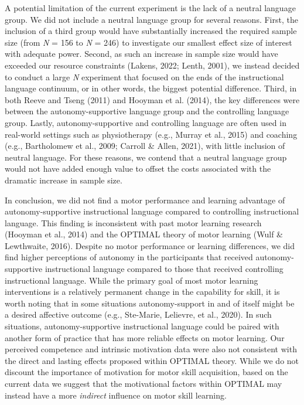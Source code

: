 \documentclass[
  man, donotrepeattitle,mask,floatsintext]{apa7}
\begin{document}
A potential limitation of the current experiment is the lack of a neutral language group. We did not include a neutral language group for several reasons. First, the inclusion of a third group would have substantially increased the required sample size (from \emph{N} = 156 to \emph{N} = 246) to investigate our smallest effect size of interest with adequate power. Second, as such an increase in sample size would have exceeded our resource constraints (Lakens, 2022; Lenth, 2001), we instead decided to conduct a large \emph{N} experiment that focused on the ends of the instructional language continuum, or in other words, the biggest potential difference. Third, in both Reeve and Tseng (2011) and Hooyman et al. (2014), the key differences were between the autonomy-supportive language group and the controlling language group. Lastly, autonomy-supportive and controlling language are often used in real-world settings such as physiotherapy (e.g., Murray et al., 2015) and coaching (e.g., Bartholomew et al., 2009; Carroll \& Allen, 2021), with little inclusion of neutral language. For these reasons, we contend that a neutral language group would not have added enough value to offset the costs associated with the dramatic increase in sample size.

In conclusion, we did not find a motor performance and learning advantage of autonomy-supportive instructional language compared to controlling instructional language. This finding is inconsistent with past motor learning research (Hooyman et al., 2014) and the OPTIMAL theory of motor learning (Wulf \& Lewthwaite, 2016). Despite no motor performance or learning differences, we did find higher perceptions of autonomy in the participants that received autonomy-supportive instructional language compared to those that received controlling instructional language. While the primary goal of most motor learning interventions is a relatively permanent change in the capability for skill, it is worth noting that in some situations autonomy-support in and of itself might be a desired affective outcome (e.g., Ste-Marie, Lelievre, et al., 2020). In such situations, autonomy-supportive instructional language could be paired with another form of practice that has more reliable effects on motor learning. Our perceived competence and intrinsic motivation data were also not consistent with the direct and lasting effects proposed within OPTIMAL theory. While we do not discount the importance of motivation for motor skill acquisition, based on the current data we suggest that the motivational factors within OPTIMAL may instead have a more \emph{indirect} influence on motor skill learning.
\end{document}

